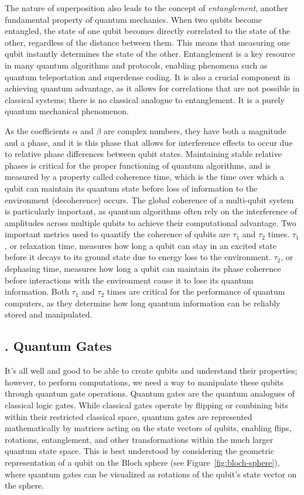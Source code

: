 \documentclass{elbioimp2}
\begin{document}
The nature of superposition also leads to the concept of \textit{entanglement}, another fundamental property of quantum mechanics. When two qubits become entangled, the state of one qubit becomes directly correlated to the state of the other, regardless of the distance between them. This means that measuring one qubit instantly determines the state of the other. Entanglement is a key resource in many quantum algorithms and protocols, enabling phenomena such as quantum teleportation and superdense coding. It is also a crucial component in achieving quantum advantage, as it allows for correlations that are not possible in classical systems; there is no classical analogue to entanglement. It is a purely quantum mechanical phenomenon.

As the coefficients $\alpha$ and $\beta$ are complex numbers, they have both a magnitude and a phase, and it is this phase that allows for interference effects to occur due to relative phase differences between qubit states. Maintaining stable relative phases is critical for the proper functioning of quantum algorithms, and is measured by a property called coherence time, which is the time over which a qubit can maintain its quantum state before loss of information to the environment (decoherence) occurs. The global coherence of a multi-qubit system is particularly important, as quantum algorithms often rely on the interference of amplitudes across multiple qubits to achieve their computational advantage. Two important metrics used to quantify the coherence of qubits are $\tau_1$ and $\tau_2$ times. $\tau_1$, or relaxation time, measures how long a qubit can stay in an excited state before it decays to its ground state due to energy loss to the environment. $\tau_2$, or dephasing time, measures how long a qubit can maintain its phase coherence before interactions with the environment cause it to lose its quantum information. Both $\tau_1$ and $\tau_2$ times are critical for the performance of quantum computers, as they determine how long quantum information can be reliably stored and manipulated.

\subsection{. Quantum Gates}

It's all well and good to be able to create qubits and understand their properties; however, to perform computations, we need a way to manipulate these qubits through quantum gate operations. Quantum gates are the quantum analogues of classical logic gates. While classical gates operate by flipping or combining bits within their restricted classical space, quantum gates are represented mathematically by matrices acting on the state vectors of qubits, enabling flips, rotations, entanglement, and other transformations within the much larger quantum state space. This is best understood by considering the geometric representation of a qubit on the Bloch sphere (see Figure~\ref{fig:bloch-sphere}), where quantum gates can be visualized as rotations of the qubit's state vector on the sphere.
\end{document}
